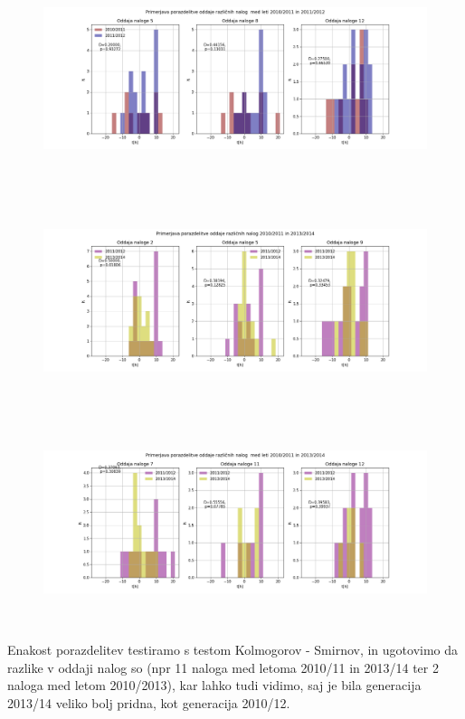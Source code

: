 \documentclass[11pt, a4paper]{article}
\begin{document}
\begin{figure}[H]
\hspace*{-2.5cm}  
  \includegraphics[width=22cm,height=6cm]{tretja_primerjava1011b.png}
 
\end{figure}
\begin{figure}[H]
\hspace*{-2.5cm}  
  \includegraphics[width=22cm,height=6cm]{tretja_primerjava1013.png}
 
\end{figure}
\begin{figure}[H]
\hspace*{-2.5cm}  
  \includegraphics[width=22cm,height=6cm]{tretja_primerjava1013b.png}
 
\end{figure}
Enakost porazdelitev testiramo s testom Kolmogorov - Smirnov, in ugotovimo da razlike v oddaji nalog so (npr 11 naloga med letoma 2010/11 in 2013/14 ter 2 naloga med letom 2010/2013), kar lahko tudi vidimo, saj je bila generacija 2013/14 veliko bolj pridna, kot generacija 2010/12. 
\end{document}
